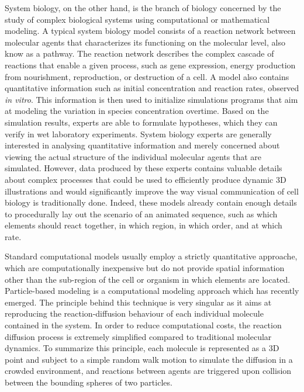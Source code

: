 System biology, on the other hand, is the branch of biology concerned by the study of complex biological systems using computational or mathematical modeling.
A typical system biology model consists of a reaction network between molecular agents that characterizes its functioning on the molecular level, also know as a pathway.
The reaction network describes the complex cascade of reactions that enable a given process, such as gene expression, energy production from nourishment, reproduction, or destruction of a cell.
A model also contains quantitative information such as initial concentration and reaction rates, observed \textit{in vitro}.
This information is then used to initialize simulations programs that aim at modeling the variation in species concentration overtime.
Based on the simulation results, experts are able to formulate hypotheses, which they can verify in wet laboratory experiments.
System biology experts are generally interested in analysing quantitative information and merely concerned about viewing the actual structure of the individual molecular agents that are simulated.
However, data produced by these experts contains valuable details about complex processes that could be used to efficiently produce dynamic 3D illustrations and would significantly improve the way visual communication of cell biology is traditionally done. 
Indeed, these models already contain enough details to procedurally lay out the scenario of an animated sequence, such as which elements should react together, in which region, in which order, and at which rate.

Standard computational models usually employ a strictly quantitative approache, which are computationally inexpensive but do not provide spatial information other than the sub-region of the cell or organism in which elements are located.
Particle-based modeling is a computational modeling approach which has recently emerged.
The principle behind this technique is very singular as it aims at reproducing the reaction-diffusion behaviour of each individual molecule contained in the system.
In order to reduce computational costs, the reaction diffusion process is extremely simplified compared to traditional molecular dynamics.
To summarize this principle, each molecule is represented as a 3D point and subject to a simple random walk motion to simulate the diffusion in a crowded environment, and reactions between agents are triggered upon collision between the bounding spheres of two particles.

